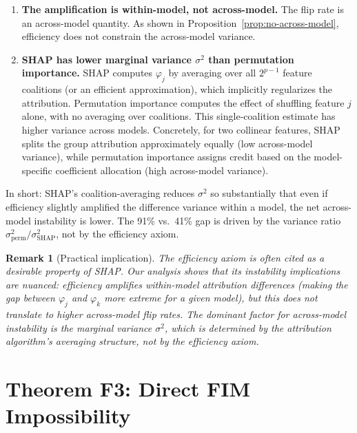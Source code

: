 \documentclass{article}
\newtheorem{remark}[theorem]{Remark}
\begin{document}
\begin{enumerate}
\item \textbf{The amplification is within-model, not across-model.}
  The flip rate is an across-model quantity.  As shown in
  Proposition~\ref{prop:no-across-model}, efficiency does not constrain
  the across-model variance.

\item \textbf{SHAP has lower marginal variance $\sigma^2$ than
  permutation importance.}  SHAP computes $\varphi_j$ by averaging
  over all $2^{p-1}$ feature coalitions (or an efficient approximation),
  which implicitly regularizes the attribution.  Permutation importance
  computes the effect of shuffling feature $j$ alone, with no averaging
  over coalitions.  This single-coalition estimate has higher variance
  across models.  Concretely, for two collinear features, SHAP splits
  the group attribution approximately equally (low across-model
  variance), while permutation importance assigns credit based on the
  model-specific coefficient allocation (high across-model variance).
\end{enumerate}

In short: SHAP's coalition-averaging reduces $\sigma^2$ so substantially
that even if efficiency slightly amplified the difference variance
within a model, the net across-model instability is lower.  The 91\%
vs.\ 41\% gap is driven by the variance ratio
$\sigma^2_{\mathrm{perm}} / \sigma^2_{\mathrm{SHAP}}$, not by the
efficiency axiom.

\begin{remark}[Practical implication]
The efficiency axiom is often cited as a desirable property of SHAP.
Our analysis shows that its instability implications are nuanced:
efficiency amplifies within-model attribution differences (making the
gap between $\varphi_j$ and $\varphi_k$ more extreme for a given model),
but this does not translate to higher across-model flip rates.  The
dominant factor for across-model instability is the marginal variance
$\sigma^2$, which is determined by the attribution algorithm's
averaging structure, not by the efficiency axiom.
\end{remark}


\section{Theorem F3: Direct FIM Impossibility}
\end{document}
